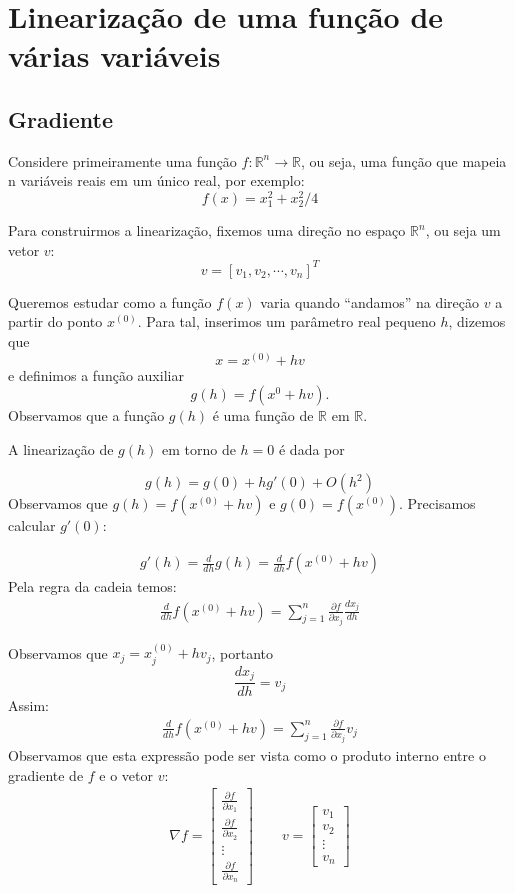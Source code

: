 \section{Linearização de uma função de várias variáveis}

\subsection{Gradiente}

Considere primeiramente uma função $f:\mathbb{R}^n\to \mathbb{R}$, ou seja, uma função que mapeia n variáveis reais em um único real, por exemplo:
$$f(x)=x_1^2+x_2^2/4$$

Para construirmos a linearização, fixemos uma direção no espaço $\mathbb{R}^n$, ou seja um vetor $v$:
$$v=[v_1,  v_2,  \cdots,  v_n]^T$$

Queremos estudar como a função $f(x)$ varia quando ``andamos'' na direção $v$ a partir do ponto $x^{(0)}$. Para tal, inserimos um parâmetro  real pequeno $h$, dizemos que $$x=x^{(0)}+hv$$ e definimos a função auxiliar
$$g(h)=f(x^{0}+hv).$$
Observamos que a função $g(h)$ é uma função de $\mathbb{R}$ em $\mathbb{R}$.



A linearização de $g(h)$ em torno de $h=0$ é dada por

$$g(h)=g(0) + hg'(0) +O(h^2)$$
Observamos que $g(h)=f(x^{(0)}+hv)$ e $g(0)=f(x^{(0)})$. Precisamos calcular $g'(0)$:

\begin{eqnarray*}
g'(h)=\frac{d}{dh}g(h)=\frac{d}{dh}f(x^{(0)}+hv)
\end{eqnarray*}
Pela regra da cadeia temos:
\begin{eqnarray*}
\frac{d}{dh}f(x^{(0)}+hv)= \sum_{j=1}^n \frac{\partial f}{\partial x_j}\frac{d x_j}{d h}
\end{eqnarray*}

Observamos que $x_j=x^{(0)}_j+hv_j$, portanto
$$\frac{d x_j}{d h}=v_j$$
Assim:
\begin{eqnarray*}
\frac{d}{dh}f(x^{(0)}+hv)= \sum_{j=1}^n \frac{\partial f}{\partial x_j}v_j
\end{eqnarray*}
Observamos que esta expressão pode ser vista como o produto interno entre o gradiente de $f$ e o vetor $v$:
\begin{eqnarray*}
\nabla f = \left[
\begin{matrix}
\frac{\partial f}{\partial x_1} \\
\frac{\partial f}{\partial x_2} \\
\vdots\\
\frac{\partial f}{\partial x_n}
\end{matrix}
\right] \qquad v=\left[
\begin{matrix}
v_1\\
v_2\\
\vdots\\
v_n
\end{matrix}
\right]
\end{eqnarray*}

